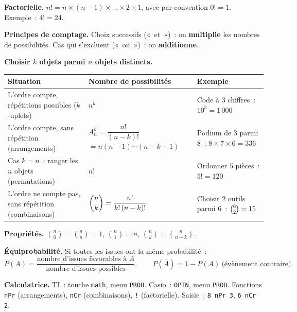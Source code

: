 \documentclass[a4paper,11pt]{article}
\begin{document}
\begin{rappel}
\textbf{Factorielle.} $n! = n \times (n-1) \times \dots \times 2 \times 1$, avec par convention $0! = 1$. Exemple~: $4! = 24$.

\smallskip
\textbf{Principes de comptage.} Choix successifs («~et~»)~: on \textbf{multiplie} les nombres de possibilités. Cas qui s'excluent («~ou~»)~: on \textbf{additionne}.

\smallskip
\textbf{Choisir $k$ objets parmi $n$ objets distincts.}\\[3pt]
{\small\renewcommand{\arraystretch}{1.45}%
\begin{tabular}{|>{\raggedright\arraybackslash}p{4.3cm}|>{\centering\arraybackslash}p{5.3cm}|>{\raggedright\arraybackslash}p{5.1cm}|}
\hline
\rowcolor{uimmblue}\color{white}\textbf{Situation} & \color{white}\textbf{Nombre de possibilités} & \color{white}\textbf{Exemple} \\ \hline
L'ordre compte, répétitions possibles ($k$-uplets) & $n^{k}$ & Code à $3$ chiffres~: $10^{3} = 1\,000$ \\ \hline
L'ordre compte, sans répétition (arrangements) & $A_n^k = \dfrac{n!}{(n-k)!}$\newline $= n(n-1)\cdots(n-k+1)$ & Podium de $3$ parmi $8$~: $8 \times 7 \times 6 = 336$ \\ \hline
Cas $k = n$~: ranger les $n$ objets (permutations) & $n!$ & Ordonner $5$ pièces~: $5! = 120$ \\ \hline
L'ordre ne compte pas, sans répétition (combinaisons) & $\dbinom{n}{k} = \dfrac{n!}{k!\,(n-k)!}$ & Choisir $2$ outils parmi $6$~: $\tbinom{6}{2} = 15$ \\ \hline
\end{tabular}}

\medskip
\textbf{Propriétés.} $\binom{n}{0} = \binom{n}{n} = 1$, \quad $\binom{n}{1} = n$, \quad $\binom{n}{k} = \binom{n}{n-k}$.

\smallskip
\textbf{Équiprobabilité.} Si toutes les issues ont la même probabilité~:
\[
P(A) = \frac{\text{nombre d'issues favorables à } A}{\text{nombre d'issues possibles}}, \qquad P(\overline{A}) = 1 - P(A) \ \text{(évènement contraire)}.
\]

\smallskip
\textbf{Calculatrice.} TI~: touche \texttt{math}, menu \texttt{PROB}. Casio~: \texttt{OPTN}, menu \texttt{PROB}. Fonctions \texttt{nPr} (arrangements), \texttt{nCr} (combinaisons), \texttt{!} (factorielle). Saisie~: \texttt{8 nPr 3}, \texttt{6 nCr 2}.
\end{rappel}
\end{document}
